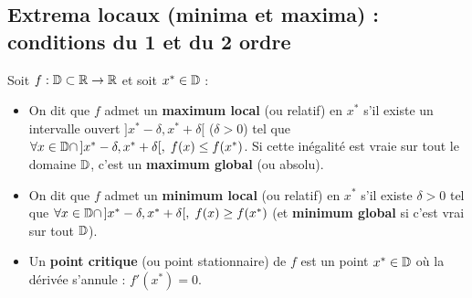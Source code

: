 \subsection{Extrema locaux (minima et maxima) : conditions du 1\ier{} et du 2\ieme{} ordre}

\begin{definition}
Soit $f : \mathbb{D} \subset \mathbb{R} \to \mathbb{R}$ et soit $x^* \in \mathbb{D}$ :
\begin{itemize}
    \item On dit que $f$ admet un \textbf{maximum local} (ou relatif) en $x^*$ s'il existe un intervalle ouvert $]x^* - \delta, x^* + \delta[$ ($\delta > 0$) tel que $\forall x \in \mathbb{D} \cap \,]x^* - \delta, x^* + \delta[,\; f(x) \le f(x^*)$. Si cette inégalité est vraie sur tout le domaine $\mathbb{D}$, c'est un \textbf{maximum global} (ou absolu).
    \item On dit que $f$ admet un \textbf{minimum local} (ou relatif) en $x^*$ s'il existe $\delta > 0$ tel que $\forall x \in \mathbb{D} \cap \,]x^* - \delta, x^* + \delta[,\; f(x) \ge f(x^*)$ (et \textbf{minimum global} si c'est vrai sur tout $\mathbb{D}$).
    \item Un \textbf{point critique} (ou point stationnaire) de $f$ est un point $x^* \in \mathbb{D}$ où la dérivée s'annule : $\boxed{f'(x^*) = 0}$.
\end{itemize}
\end{definition}

